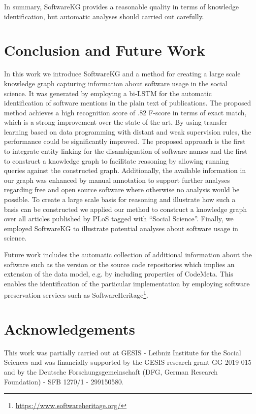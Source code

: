 \documentclass[runningheads]{llncs}
\begin{document}
In summary, SoftwareKG provides a reasonable quality in terms of knowledge identification, but automatic analyses should carried out carefully.

\section{Conclusion and Future Work}
In this work we introduce SoftwareKG and a method for creating a large scale knowledge graph capturing information about software usage in the social science.
It was generated by employing a bi-LSTM for the automatic identification of software mentions in the plain text of publications. 
The proposed method achieves a high recognition score of .82 F-score in terms of exact match, which is a strong improvement over the state of the art.
By using transfer learning based on data programming with distant and weak supervision rules, the performance could be significantly improved.
The proposed approach is the first to integrate entity linking for the disambiguation of software names and the first to construct a knowledge graph to facilitate reasoning by allowing running queries against the constructed graph. 
Additionally, the available information in our graph was enhanced by manual annotation to support further analyses regarding free and open source software where otherwise no analysis would be possible. 
To create a large scale basis for reasoning and illustrate how such a basis can be constructed we applied our method to construct a knowledge graph over all articles published by PLoS tagged with ``Social Science''.
Finally, we employed SoftwareKG to illustrate potential analyses about software usage in science.

Future work includes the automatic collection of additional information about the software such as the version or the source code repositories which implies an extension of the data model, e.g. by including properties of CodeMeta.
This enables the identification of the particular implementation by employing software preservation services such as SoftwareHeritage\footnote{\url{https://www.softwareheritage.org/}}.

\section*{Acknowledgements}
This work was partially carried out at GESIS - Leibniz Institute for the Social Sciences and was financially supported by the GESIS research grant GG-2019-015 and by the Deutsche Forschungsgemeinschaft (DFG, German Research Foundation) - SFB 1270/1 - 299150580.




\end{document}
